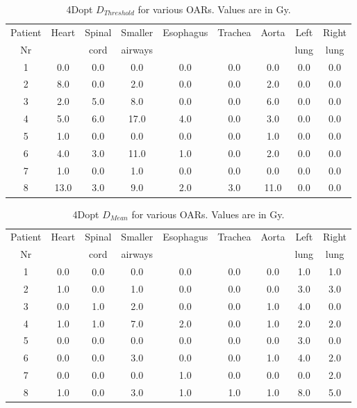\begin{table}[H]
  \centering
  \caption{4Dopt $D_{Threshold}$ for various OARs. Values are in Gy.}
  \begin{tabular}{c|c|c|c|c|c|c|c|c}
   Patient & \multirow{2}{*}{Heart} & Spinal  & Smaller  & \multirow{2}{*}{Esophagus} & \multirow{2}{*}{Trachea} & \multirow{2}{*}{Aorta} & Left  & Right \\
   Nr & & cord & airways & & & & lung & lung \\
 \hline\hline 
1 & 0.0 & 0.0 & 0.0 & 0.0 & 0.0 & 0.0 & 0.0 & 0.0 \\ 
2 & 8.0 & 0.0 & 2.0 & 0.0 & 0.0 & 2.0 & 0.0 & 0.0 \\ 
3 & 2.0 & 5.0 & 8.0 & 0.0 & 0.0 & 6.0 & 0.0 & 0.0 \\ 
4 & 5.0 & 6.0 & 17.0 & 4.0 & 0.0 & 3.0 & 0.0 & 0.0 \\ 
5 & 1.0 & 0.0 & 0.0 & 0.0 & 0.0 & 1.0 & 0.0 & 0.0 \\ 
6 & 4.0 & 3.0 & 11.0 & 1.0 & 0.0 & 2.0 & 0.0 & 0.0 \\ 
7 & 1.0 & 0.0 & 1.0 & 0.0 & 0.0 & 0.0 & 0.0 & 0.0 \\ 
8 & 13.0 & 3.0 & 9.0 & 2.0 & 3.0 & 11.0 & 0.0 & 0.0 \\ 

\hline\hline
  \end{tabular}
  \label{tab:oarlimits1}
\end{table}

\begin{table}[H]
  \centering
  \caption{4Dopt $D_{Mean}$ for various OARs. Values are in Gy.}
  \begin{tabular}{c|c|c|c|c|c|c|c|c}
   Patient & \multirow{2}{*}{Heart} & Spinal  & Smaller  & \multirow{2}{*}{Esophagus} & \multirow{2}{*}{Trachea} & \multirow{2}{*}{Aorta} & Left  & Right \\
   Nr & & cord & airways & & & & lung & lung \\
 \hline\hline 
1 & 0.0 & 0.0 & 0.0 & 0.0 & 0.0 & 0.0 & 1.0 & 1.0 \\ 
2 & 1.0 & 0.0 & 1.0 & 0.0 & 0.0 & 0.0 & 3.0 & 3.0 \\ 
3 & 0.0 & 1.0 & 2.0 & 0.0 & 0.0 & 1.0 & 4.0 & 0.0 \\ 
4 & 1.0 & 1.0 & 7.0 & 2.0 & 0.0 & 1.0 & 2.0 & 2.0 \\ 
5 & 0.0 & 0.0 & 0.0 & 0.0 & 0.0 & 0.0 & 3.0 & 0.0 \\ 
6 & 0.0 & 0.0 & 3.0 & 0.0 & 0.0 & 1.0 & 4.0 & 2.0 \\ 
7 & 0.0 & 0.0 & 0.0 & 1.0 & 0.0 & 0.0 & 0.0 & 2.0 \\ 
8 & 1.0 & 0.0 & 3.0 & 1.0 & 1.0 & 1.0 & 8.0 & 5.0 \\ 
\hline\hline
  \end{tabular}
  \label{tab:oarlimits1}
\end{table}

